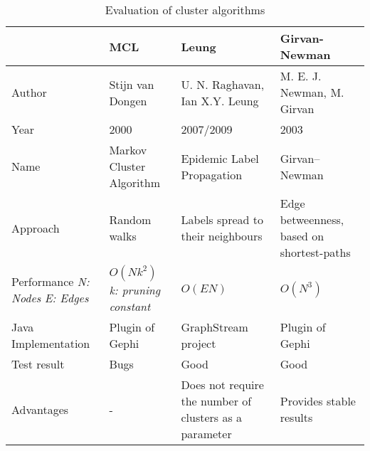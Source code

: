 \begin{table}[H]
\centering
\caption{Evaluation of cluster algorithms}
\label{tab:clusterAlgorithms}
\begin{tabular}{|p{2cm}|p{4cm}|p{4cm}|p{4cm}|}
\hline
                    & \textbf{MCL}               & \textbf{Leung}                    & \textbf{Girvan-Newman}  \\ \hline
Author              & Stijn van Dongen\cite{markovCluster} & U. N. Raghavan\cite{raghavan}, Ian X.Y. Leung\cite{leung}    & M. E. J. Newman, M. Girvan\cite{girvan} \\ \hline
Year                & 2000                       & 2007/2009                         & \multicolumn{1}{l|}{2003}                       \\ \hline
Name                & Markov Cluster Algorithm   & Epidemic Label Propagation        & \multicolumn{1}{l|}{Girvan–Newman}              \\ \hline
Approach            & Random walks               & Labels spread to their neighbours & Edge betweenness, based on shortest-paths       \\ \hline
Performance \newline \textit{N: Nodes} \newline \textit{E: Edges}         & $O (N k^2)$ \newline \textit{k: pruning constant} \cite[p.126]{markovCluster} & $O( E N )$ \cite[p.3]{leung}                         & $O ( N^3 )$\cite[p.14]{girvan}       \\ \hline
Java Implementation & Plugin of Gephi\cite{gephiMarkov} & GraphStream project\cite{leungGraphstream} & Plugin of Gephi\cite{girvanGraphstream} \\ \hline
Test result         & Bugs                       & Good                              & \multicolumn{1}{l|}{Good}                       \\ \hline
Advantages & - & Does not require the number of clusters as a parameter & Provides stable results \\
 \hline
\end{tabular}
\end{table}
